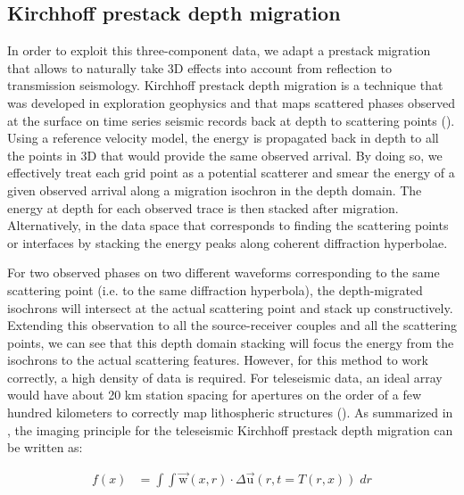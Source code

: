 \documentclass[10pt,a4paper]{article}
\numberwithin{equation}{section}
\DeclareRobustCommand{\rq}[1]{{\sethlcolor{myblue}\hl{#1}}}
\begin{document}
\subsection{Kirchhoff prestack depth migration}

In order to exploit this three-component data, we adapt a prestack migration that allows to naturally take 3D effects into account from reflection to transmission seismology. 
Kirchhoff prestack depth migration is a technique that was developed in exploration geophysics and that maps scattered phases observed at the surface on time series seismic records back at depth to scattering points (\cite{ylma_book_01}).
Using a reference velocity model, the energy is propagated back in depth to all the points in 3D that would provide the same observed arrival.
By doing so, we effectively treat each grid point as a potential scatterer and smear the energy of a given observed arrival along a migration isochron in the depth domain.
The energy at depth for each observed trace is then stacked after migration.
Alternatively, in the data space that corresponds to finding the scattering points or interfaces by stacking the energy peaks along coherent diffraction hyperbolae.

For two observed phases on two different waveforms corresponding to the same scattering point (i.e. to the same diffraction hyperbola), the depth-migrated isochrons will intersect at the actual scattering point and stack up constructively.
Extending this observation to all the source-receiver couples and all the scattering points, we can see that this depth domain stacking will focus the energy from the isochrons to the actual scattering features.
However, for this method to work correctly, a high density of data is required.
For teleseismic data, an ideal array would have about 20 km station spacing for apertures on the order of a few hundred kilometers to correctly map lithospheric structures (\cite{rond_sgeo_09}).
As summarized in \cite{rond_sgeo_09}, the imaging principle for the teleseismic Kirchhoff prestack depth migration can be written as:

\begin{align}
  f(x) &= \int\!\!\!\!\int \vec{\text{w}}(x,r) \cdot \Delta\vec{\text{u}}(r,t=T(r,x)) \; dr
  \label{gen}
\end{align}
\vspace{1mm}
\end{document}
